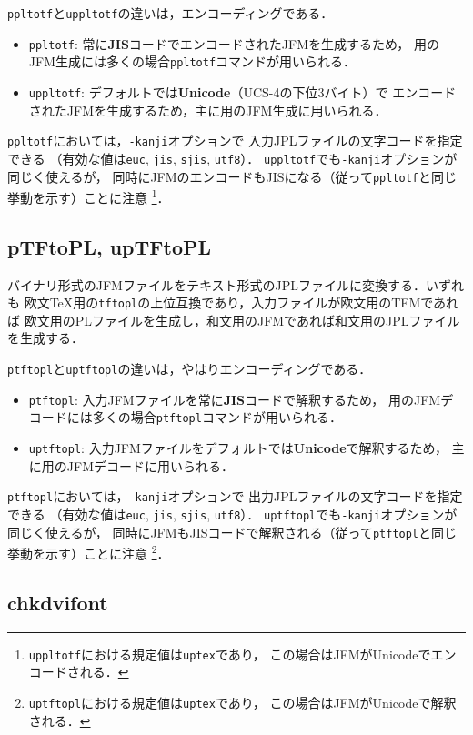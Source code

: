 \documentclass[a4paper,11pt,nomag]{jsarticle}
\def\code#1{\texttt{#1}}
\begin{document}
\code{ppltotf}と\code{uppltotf}の違いは，エンコーディングである．
\begin{itemize}
  \item \code{ppltotf}: 常に\textbf{JIS}コードでエンコードされたJFMを生成するため，
    \pTeX 用のJFM生成には多くの場合\code{ppltotf}コマンドが用いられる．
  \item \code{uppltotf}: デフォルトでは\textbf{Unicode}（UCS-4の下位3バイト）で
    エンコードされたJFMを生成するため，主に\upTeX 用のJFM生成に用いられる．
\end{itemize}

\code{ppltotf}においては，\code{-kanji}オプションで
入力JPLファイルの文字コードを指定できる
（有効な値は\code{euc}, \code{jis}, \code{sjis}, \code{utf8}）．
\code{uppltotf}でも\code{-kanji}オプションが同じく使えるが，
同時にJFMのエンコードもJISになる（従って\code{ppltotf}と同じ挙動を示す）ことに注意
\footnote{\code{uppltotf}における規定値は\code{uptex}であり，
この場合はJFMがUnicodeでエンコードされる．}．

\subsection{pTFtoPL, upTFtoPL}

バイナリ形式のJFMファイルをテキスト形式のJPLファイルに変換する．いずれも
欧文\TeX 用の\code{tftopl}の上位互換であり，入力ファイルが欧文用のTFMであれば
欧文用のPLファイルを生成し，和文用のJFMであれば和文用のJPLファイルを生成する．

\code{ptftopl}と\code{uptftopl}の違いは，やはりエンコーディングである．
\begin{itemize}
  \item \code{ptftopl}: 入力JFMファイルを常に\textbf{JIS}コードで解釈するため，
    \pTeX 用のJFMデコードには多くの場合\code{ptftopl}コマンドが用いられる．
  \item \code{uptftopl}: 入力JFMファイルをデフォルトでは\textbf{Unicode}で解釈するため，
    主に\upTeX 用のJFMデコードに用いられる．
\end{itemize}

\code{ptftopl}においては，\code{-kanji}オプションで
出力JPLファイルの文字コードを指定できる
（有効な値は\code{euc}, \code{jis}, \code{sjis}, \code{utf8}）．
\code{uptftopl}でも\code{-kanji}オプションが同じく使えるが，
同時にJFMもJISコードで解釈される（従って\code{ptftopl}と同じ挙動を示す）ことに注意
\footnote{\code{uptftopl}における規定値は\code{uptex}であり，
この場合はJFMがUnicodeで解釈される．}．

\subsection{chkdvifont}
\end{document}
